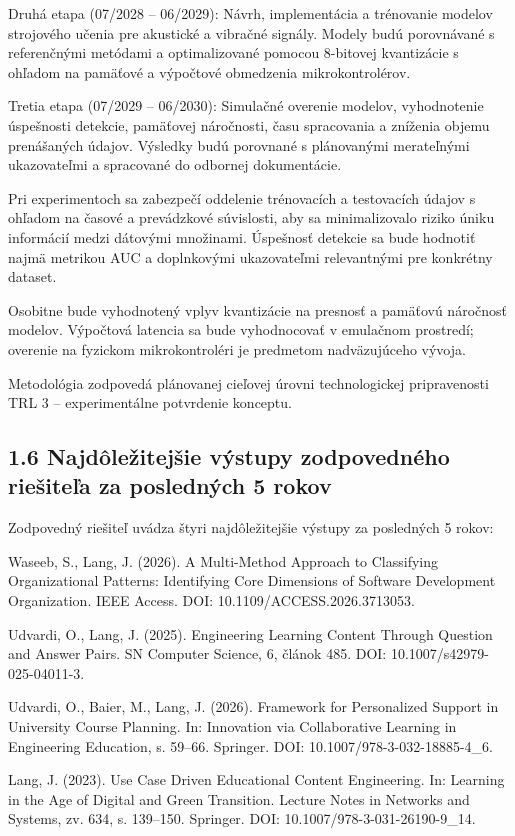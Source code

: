 \documentclass[10pt,a4paper]{article}
\begin{document}
Druhá etapa (07/2028 – 06/2029): Návrh, implementácia a trénovanie modelov strojového učenia pre akustické a vibračné signály. Modely budú porovnávané s referenčnými metódami a optimalizované pomocou 8-bitovej kvantizácie s ohľadom na pamäťové a výpočtové obmedzenia mikrokontrolérov.

Tretia etapa (07/2029 – 06/2030): Simulačné overenie modelov, vyhodnotenie úspešnosti detekcie, pamäťovej náročnosti, času spracovania a zníženia objemu prenášaných údajov. Výsledky budú porovnané s plánovanými merateľnými ukazovateľmi a spracované do odbornej dokumentácie.

Pri experimentoch sa zabezpečí oddelenie trénovacích a testovacích údajov s ohľadom na časové a prevádzkové súvislosti, aby sa minimalizovalo riziko úniku informácií medzi dátovými množinami. Úspešnosť detekcie sa bude hodnotiť najmä metrikou AUC a doplnkovými ukazovateľmi relevantnými pre konkrétny dataset.

Osobitne bude vyhodnotený vplyv kvantizácie na presnosť a pamäťovú náročnosť modelov. Výpočtová latencia sa bude vyhodnocovať v emulačnom prostredí; overenie na fyzickom mikrokontroléri je predmetom nadväzujúceho vývoja.

Metodológia zodpovedá plánovanej cieľovej úrovni technologickej pripravenosti TRL 3 – experimentálne potvrdenie konceptu.

\subsection*{1.6 Najdôležitejšie výstupy zodpovedného
riešiteľa za posledných 5 rokov}

Zodpovedný riešiteľ uvádza štyri najdôležitejšie výstupy za posledných 5 rokov:

Waseeb, S., Lang, J. (2026). A Multi-Method Approach to Classifying Organizational Patterns: Identifying Core Dimensions of Software Development Organization. IEEE Access. DOI: 10.1109/ACCESS.2026.3713053.

Udvardi, O., Lang, J. (2025). Engineering Learning Content Through Question and Answer Pairs. SN Computer Science, 6, článok 485. DOI: 10.1007/s42979-025-04011-3.

Udvardi, O., Baier, M., Lang, J. (2026). Framework for Personalized Support in University Course Planning. In: Innovation via Collaborative Learning in Engineering Education, s. 59–66. Springer. DOI: 10.1007/978-3-032-18885-4\_6.

Lang, J. (2023). Use Case Driven Educational Content Engineering. In: Learning in the Age of Digital and Green Transition. Lecture Notes in Networks and Systems, zv. 634, s. 139–150. Springer. DOI: 10.1007/978-3-031-26190-9\_14.
\end{document}
